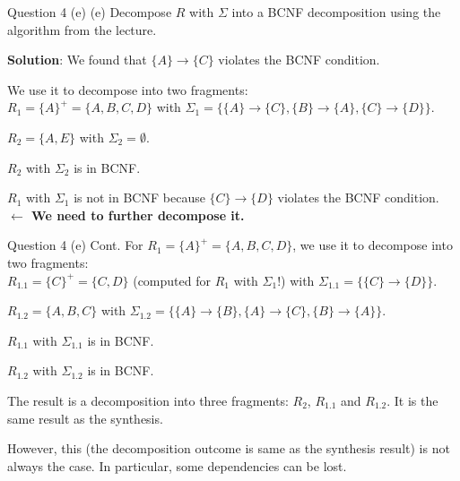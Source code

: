 \begin{frame}[fragile]{Question 4 (e)}
(e) Decompose $R$ with $\Sigma$ into a BCNF decomposition using the algorithm from the lecture.\\\vspace{5pt}

\textbf{Solution}: We found that $\{A\} \rightarrow \{C\}$ violates the BCNF condition.\\\vspace{3pt}

We use it to decompose into two fragments:\\
$R_1 = \{A\}^{+} = \{A, B, C, D\}$ with $\Sigma_1 = \{\{A\} \rightarrow \{C\}, \{B\} \rightarrow \{A\}, \{C\} \rightarrow \{D\}\}$.

$R_2 = \{A, E\}$ with $\Sigma_2 = \emptyset$.

$R_2$ with $\Sigma_2$ is in BCNF.

$R_1$ with $\Sigma_1$ is not in BCNF because $\{C\} \rightarrow \{D\}$ violates the BCNF condition.
\textbf{$\leftarrow$ We need to further decompose it.}
\end{frame}

\begin{frame}[fragile]{Question 4 (e) Cont.}
For $R_1 = \{A\}^{+} = \{A, B, C, D\}$, we use it to decompose into two fragments:\\\vspace{5pt}
$R_{1.1} = \{C\}^{+} = \{C, D\}$ (computed for $R_1$ with $\Sigma_1$!) with $\Sigma_{1.1} = \{\{C\} \rightarrow \{D\}\}$.

$R_{1.2} = \{A, B, C\}$ with $\Sigma_{1.2} = \{\{A\} \rightarrow \{B\}, \{A\} \rightarrow \{C\}, \{B\} \rightarrow \{A\}\}$.\\\vspace{5pt}

$R_{1.1}$ with $\Sigma_{1.1}$ is in BCNF.

$R_{1.2}$ with $\Sigma_{1.2}$ is in BCNF.\\\vspace{5pt}

The result is a decomposition into three fragments: $R_2$, $R_{1.1}$ and $R_{1.2}$. It is the same result as the synthesis.\\\vspace{5pt}

However, this (the decomposition outcome is same as the synthesis result) is not always the case. In particular, some dependencies can be lost.
\end{frame}

